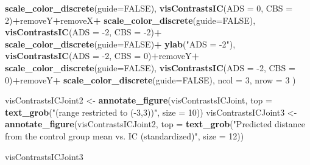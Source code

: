 \documentclass[10pt,dvipsnames,enabledeprecatedfontcommands]{scrartcl}
\newenvironment{Shaded}{\begin{snugshade}}{\end{snugshade}}
\newcommand{\KeywordTok}[1]{\textcolor[rgb]{0.13,0.29,0.53}{\textbf{#1}}}
\newcommand{\DataTypeTok}[1]{\textcolor[rgb]{0.13,0.29,0.53}{#1}}
\newcommand{\DecValTok}[1]{\textcolor[rgb]{0.00,0.00,0.81}{#1}}
\newcommand{\StringTok}[1]{\textcolor[rgb]{0.31,0.60,0.02}{#1}}
\newcommand{\OtherTok}[1]{\textcolor[rgb]{0.56,0.35,0.01}{#1}}
\newcommand{\OperatorTok}[1]{\textcolor[rgb]{0.81,0.36,0.00}{\textbf{#1}}}
\newcommand{\NormalTok}[1]{#1}
\begin{document}
\begin{Shaded}
\begin{Highlighting}[]
\StringTok{  }\KeywordTok{scale_color_discrete}\NormalTok{(}\DataTypeTok{guide=}\OtherTok{FALSE}\NormalTok{),}
    \KeywordTok{visContrastsIC}\NormalTok{(}\DataTypeTok{ADS =} \DecValTok{0}\NormalTok{, }\DataTypeTok{CBS =} \DecValTok{2}\NormalTok{)}\OperatorTok{+}\NormalTok{removeY}\OperatorTok{+}\NormalTok{removeX}\OperatorTok{+}\StringTok{ }\KeywordTok{scale_color_discrete}\NormalTok{(}\DataTypeTok{guide=}\OtherTok{FALSE}\NormalTok{),  }
\KeywordTok{visContrastsIC}\NormalTok{(}\DataTypeTok{ADS =} \DecValTok{-2}\NormalTok{, }\DataTypeTok{CBS =} \DecValTok{-2}\NormalTok{)}\OperatorTok{+}\StringTok{ }\KeywordTok{scale_color_discrete}\NormalTok{(}\DataTypeTok{guide=}\OtherTok{FALSE}\NormalTok{)}\OperatorTok{+}
\StringTok{  }\KeywordTok{ylab}\NormalTok{(}\StringTok{"ADS = -2"}\NormalTok{),}
    \KeywordTok{visContrastsIC}\NormalTok{(}\DataTypeTok{ADS =} \DecValTok{-2}\NormalTok{, }\DataTypeTok{CBS =} \DecValTok{0}\NormalTok{)}\OperatorTok{+}\NormalTok{removeY}\OperatorTok{+}\StringTok{ }\KeywordTok{scale_color_discrete}\NormalTok{(}\DataTypeTok{guide=}\OtherTok{FALSE}\NormalTok{),}
    \KeywordTok{visContrastsIC}\NormalTok{(}\DataTypeTok{ADS =} \DecValTok{-2}\NormalTok{, }\DataTypeTok{CBS =} \DecValTok{0}\NormalTok{)}\OperatorTok{+}\NormalTok{removeY}\OperatorTok{+}\StringTok{ }\KeywordTok{scale_color_discrete}\NormalTok{(}\DataTypeTok{guide=}\OtherTok{FALSE}\NormalTok{), }
\DataTypeTok{ncol =} \DecValTok{3}\NormalTok{, }\DataTypeTok{nrow =} \DecValTok{3}
\NormalTok{)}

\NormalTok{visContrastsICJoint2 <-}\StringTok{ }\KeywordTok{annotate_figure}\NormalTok{(visContrastsICJoint, }
\DataTypeTok{top =} \KeywordTok{text_grob}\NormalTok{(}\StringTok{"(range restricted to (-3,3))"}\NormalTok{, }
                \DataTypeTok{size =} \DecValTok{10}\NormalTok{))}
\NormalTok{visContrastsICJoint3 <-}\StringTok{ }\KeywordTok{annotate_figure}\NormalTok{(visContrastsICJoint2, }
 \DataTypeTok{top =} \KeywordTok{text_grob}\NormalTok{(}\StringTok{"Predicted distance from the control group mean vs. IC (standardized)"}\NormalTok{,}
                \DataTypeTok{size =} \DecValTok{12}\NormalTok{))}

\NormalTok{visContrastsICJoint3}
\end{Highlighting}
\end{Shaded}
\end{document}
